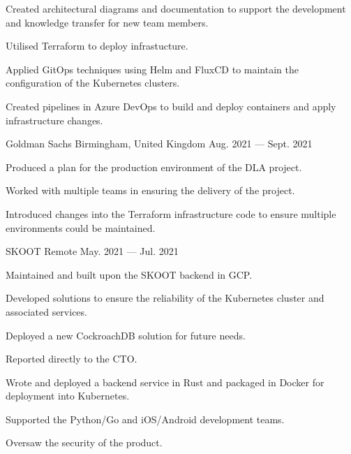 \begin{cventries}
{\begin{cvitems}
        \item{Created architectural diagrams and documentation to support the development and knowledge transfer for new team members.}
        \item{Utilised Terraform to deploy infrastucture.}
        \item{Applied GitOps techniques using Helm and FluxCD to maintain the configuration of the Kubernetes clusters.}
        \item{Created pipelines in Azure DevOps to build and deploy containers and apply infrastructure changes.}
        \end{cvitems}
    }
    {Goldman Sachs}
    {Birmingham, United Kingdom}
    {Aug. 2021 — Sept. 2021}
    {
        \begin{cvitems}
        \item{Produced a plan for the production environment of the DLA project.}
        \item{Worked with multiple teams in ensuring the delivery of the project.}
        \item{Introduced changes into the Terraform infrastructure code to ensure multiple environments could be maintained.}
        \end{cvitems}
    }

    {SKOOT}
    {Remote}
    {May. 2021 — Jul. 2021}
    {
        \begin{cvitems}
        \item{Maintained and built upon the SKOOT backend in GCP.}
        \item{Developed solutions to ensure the reliability of the Kubernetes cluster and associated services.}
        \item{Deployed a new CockroachDB solution for future needs.}
        \item{Reported directly to the CTO.}
        \item{Wrote and deployed a backend service in Rust and packaged in Docker for deployment into Kubernetes.}
        \item{Supported the Python/Go and iOS/Android development teams.}
        \item{Oversaw the security of the product.}
        \end{cvitems}
    }


\end{cventries}
